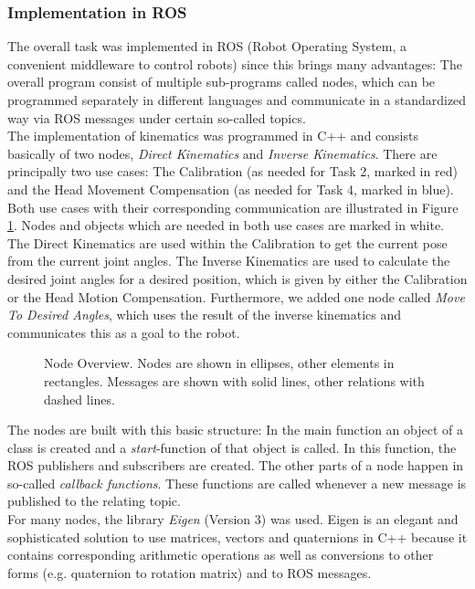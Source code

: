 \documentclass[conference]{IEEEtran}
\begin{document}
\subsubsection{Implementation in ROS}
The overall task was implemented in ROS (Robot Operating System, a convenient middleware to control robots) since this brings many advantages: The overall program consist of multiple sub-programs called nodes, which can be programmed separately in different languages and communicate in a standardized way via ROS messages under certain so-called topics.\\
The implementation of kinematics was programmed in C++ and consists basically of two nodes, \textit{Direct Kinematics} and \textit{Inverse Kinematics}. There are principally two use cases: The Calibration (as needed for Task 2, marked in red) and the Head Movement Compensation (as needed for Task 4, marked in blue). Both use cases with their corresponding communication are illustrated in Figure \ref{fig:Nodes}. Nodes and objects which are needed in both use cases are marked in white.  The Direct Kinematics are used within the Calibration to get the current pose from the current joint angles. The Inverse Kinematics are used to calculate the desired joint angles for a desired position, which is given by either the Calibration or the Head Motion Compensation. Furthermore, we added one node called \textit{Move To Desired Angles}, which uses the result of the inverse kinematics and communicates this as a goal to the robot.\\
\begin{figure}[h]
	\centering
	\def\svgwidth{270pt}
	
	\caption{Node Overview. Nodes are shown in ellipses, other elements in rectangles. Messages are shown with solid lines, other relations with dashed lines.}
	\label{fig:Nodes}
\end{figure}
The nodes are built with this basic structure: In the main function an object of a class is created and a \textit{start}-function of that object is called. In this function, the ROS publishers and subscribers are created. The other parts of a node happen in so-called \textit{callback functions}. These functions are called whenever a new message is published to the relating topic.\\
For many nodes, the library \textit{Eigen} (Version 3) \cite{Eigen} was used. Eigen is an elegant and sophisticated solution to use matrices, vectors and quaternions in C++ because it contains corresponding arithmetic operations as well as conversions to other forms (e.g. quaternion to rotation matrix) and to ROS messages.
\end{document}
